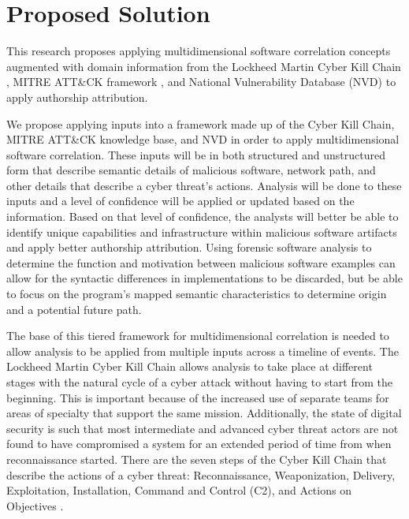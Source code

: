 \documentclass[12pt]{report}
\begin{document}
\chapter{Proposed Solution}
\label{chap:three}
This research proposes applying multidimensional software correlation concepts augmented with domain information from the Lockheed Martin Cyber Kill Chain \cite{hutchins2011intelligence}, MITRE ATT\&CK framework \cite{strom2018mitre}, and National Vulnerability Database (NVD) \cite{zhang2011empirical} to apply authorship attribution.    

We propose applying inputs into a framework made up of the Cyber Kill Chain, MITRE ATT&CK knowledge base, and NVD in order to apply multidimensional software correlation.  These inputs will be in both structured and unstructured form that describe semantic details of malicious software, network path, and other details that describe a cyber threat's actions.  Analysis will be done to these inputs and a level of confidence will be applied or updated based on the information.  Based on that level of confidence, the analysts will better be able to identify unique capabilities and infrastructure within malicious software artifacts and apply better authorship attribution.  Using forensic software analysis to determine the function and motivation between malicious software examples can allow for the syntactic differences in implementations to be discarded, but be able to focus on the program's mapped semantic characteristics to determine origin and a potential future path.

The base of this tiered framework for multidimensional correlation is needed to allow analysis to be applied from multiple inputs across a timeline of events.  The Lockheed Martin Cyber Kill Chain allows analysis to take place at different stages with the natural cycle of a cyber attack without having to start from the beginning.  This is important because of the increased use of separate teams for areas of specialty that support the same mission.  Additionally, the state of digital security is such that most intermediate and advanced cyber threat actors are not found to have compromised a system for an extended period of time from when reconnaissance started.  There are the seven steps of the Cyber Kill Chain that describe the actions of a cyber threat: Reconnaissance, Weaponization, Delivery, Exploitation, Installation, Command and Control (C2), and Actions on Objectives \cite{martin2014cyber}.
\end{document}
